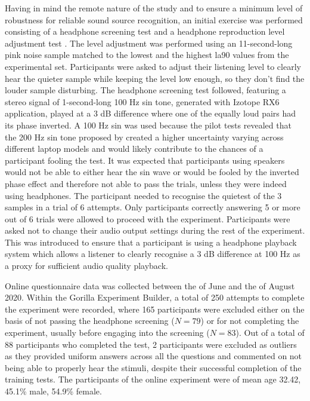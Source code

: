    Having in mind the remote nature of the study and to ensure a minimum level of robustness for reliable sound source recognition, an initial exercise was performed consisting of a headphone screening test \citep{Woods2017Headphone} and a headphone reproduction level adjustment test \citep{Gontier2019Estimation}. The level adjustment was performed using an 11-second-long pink noise sample matched to the lowest and the highest \gls{la90} values from the experimental set. Participants were asked to adjust their listening level to clearly hear the quieter sample while keeping the level low enough, so they don't find the louder sample disturbing. The headphone screening test followed, featuring a stereo signal of 1-second-long 100 Hz sin tone, generated with Izotope RX6 application, played at a 3 dB difference where one of the equally loud pairs had its phase inverted. A 100 Hz sin was used because the pilot tests revealed that the 200 Hz sin tone proposed by \citet{Woods2017Headphone} created a higher uncertainty varying across different laptop models and would likely contribute to the chances of a participant fooling the test. It was expected that participants using speakers would not be able to either hear the sin wave or would be fooled by the inverted phase effect and therefore not able to pass the trials, unless they were indeed using headphones. The participant needed to recognise the quietest of the 3 samples in a trial of 6 attempts. Only participants correctly answering 5 or more out of 6 trials were allowed to proceed with the experiment. Participants were asked not to change their audio output settings during the rest of the experiment. This was introduced to ensure that a participant is using a headphone playback system which allows a listener to clearly recognise a 3 dB difference at 100 Hz as a proxy for sufficient audio quality playback.

   Online questionnaire data was collected between the  of June and the  of August 2020. Within the Gorilla Experiment Builder, a total of 250 attempts to complete the experiment were recorded, where 165 participants were excluded either on the basis of not passing the headphone screening ($N=79$) or for not completing the experiment, usually before engaging into the screening ($N=83$). Out of a total of 88 participants who completed the test, 2 participants were excluded as outliers as they provided uniform answers across all the questions and commented on not being able to properly hear the stimuli, despite their successful completion of the training tests. The participants of the online experiment were of mean age 32.42, 45.1\% male, 54.9\% female.

